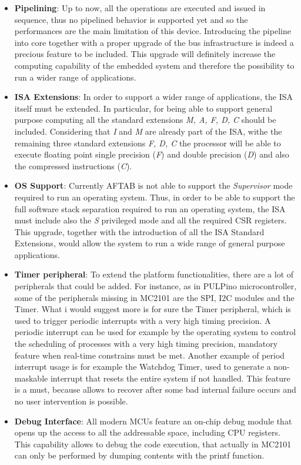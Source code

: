\begin{itemize}
\item \textbf{Pipelining}: Up to now, all the operations are executed and issued in sequence, thus no pipelined behavior is supported yet and so the performances are the main limitation of this device. Introducing the pipeline into core together with a proper upgrade of the bus infrastructure is indeed a precious feature to be included. This upgrade will definitely increase the computing capability of the embedded system and therefore the possibility to run a wider range of applications.

\item \textbf{ISA Extensions}: In order to support a wider range of applications, the ISA itself must be extended. In particular, for being able to support general purpose computing all the standard extensions \emph{M, A, F, D, C} should be included. Considering that \emph{I} and \emph{M} are already part of the ISA, withe the remaining three standard extensions \emph{F, D, C} the processor will be able to execute floating point single precision (\emph{F}) and double precision (\emph{D}) and also the compressed instructions (\emph{C}).\\

\item \textbf{OS Support}: Currently AFTAB is not able to support the \emph{Supervisor} mode required to run an operating system. Thus, in order to be able to support the full software stack separation required to run an operating system, the ISA must include also the \emph{S} privileged mode and all the required CSR registers. This upgrade, together with the introduction of all the ISA Standard Extensions, would allow the system to run a wide range of general purpose applications.  
\item \textbf{Timer peripheral}: To extend the platform functionalities, there are a lot of peripherals that could be added. For instance, as in PULPino microcontroller, some of the peripherals missing in MC2101 are the SPI, I2C modules and the Timer. What i would suggest more is for sure the Timer peripheral, which is used to trigger periodic interrupts with a very high timing precision. A periodic interrupt can be used for example by the operating system to control the scheduling of processes with a very high timing precision, mandatory feature when real-time constrains must be met. Another example of period interrupt usage is for example the Watchdog Timer, used to generate a non-maskable interrupt that resets the entire system if not handled. This feature is a must, because allows to recover after some bad internal failure occurs and no user intervention is possible. 
\item \textbf{Debug Interface}: All modern MCUs feature an on-chip debug module that opens up the access to all the addressable space, including CPU registers. This capability allows to debug the code execution, that actually in MC2101 can only be performed by dumping contents with the printf function.
\end{itemize}

